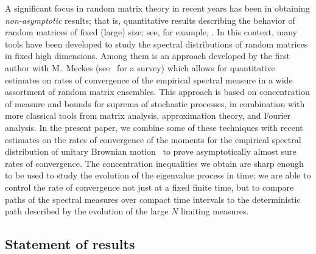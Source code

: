 \documentclass[11pt]{article}
\theoremstyle{definition}
\numberwithin{equation}{section}
\numberwithin{figure}{section}
\numberwithin{table}{section}
\begin{document}
A significant focus in random matrix theory in recent years has been in obtaining
\emph{non-asymptotic} results; that is, quantitative results describing the behavior of random matrices of fixed (large) size; see, for example, \cite{RudVer10}. In this context, many tools have been developed to study the spectral distributions of random matrices in fixed high dimensions. Among them is an approach developed by the first author with M.~Meckes (see~\cite{MM2016} for a survey) which allows for quantitative estimates on rates of convergence of the empirical spectral measure in a wide assortment of random matrix ensembles. This approach is based on concentration of measure and bounds for suprema of stochastic processes, in combination with more classical tools from matrix analysis, approximation theory, and Fourier analysis. In the present paper, we combine some of these techniques with recent estimates on the rates of convergence of the moments for the empirical spectral distribution of unitary Brownian motion~\cite{CDK2016} to prove asymptotically almost sure rates of convergence. The concentration inequalities we obtain are sharp enough to be used to study the evolution of the eigenvalue process in time; we are able to control the rate of convergence not just at a fixed finite time, but to compare paths of the spectral measures over compact time intervals to the deterministic path described by the evolution of the large $N$ limiting measures.


\subsection*{Statement of results}
\end{document}
